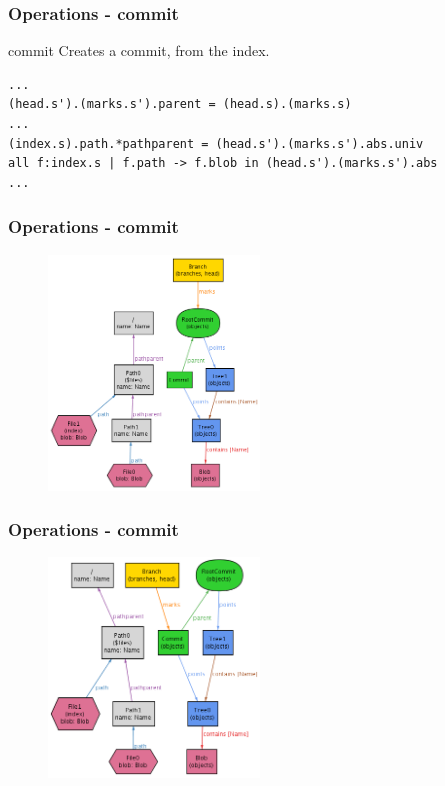 \documentclass{beamer}
\begin{document}
\begin{frame}[fragile]
   \frametitle{Operations - commit}
   \begin{block}{commit}
      Creates a commit, from the index.
   \end{block}
   \tiny
   \begin{lstlisting}
...
(head.s').(marks.s').parent = (head.s).(marks.s)
...
(index.s).path.*pathparent = (head.s').(marks.s').abs.univ
all f:index.s | f.path -> f.blob in (head.s').(marks.s').abs
...
   \end{lstlisting}
\end{frame}

\begin{frame}[fragile]
   \frametitle{Operations - commit}
   \begin{figure}
      \centering
      \includegraphics[width=0.5\textwidth]{images/commit1.png}
   \end{figure}
\end{frame}

\begin{frame}[fragile]
   \frametitle{Operations - commit}
   \begin{figure}
      \centering
      \includegraphics[width=0.5\textwidth]{images/commit2.png}
   \end{figure}
\end{frame}
\end{document}
